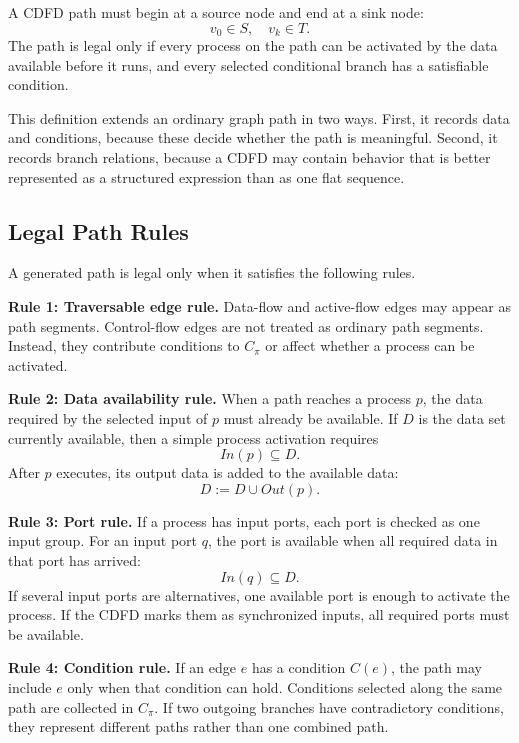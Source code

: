 \documentclass[conference]{template/IEEEtran}
\begin{document}
A CDFD path must begin at a source node and end at a sink node:
\begin{equation}
v_0\in S,\quad v_k\in T .
\end{equation}
The path is legal only if every process on the path can be activated by the data available before it runs, and every selected conditional branch has a satisfiable condition.

This definition extends an ordinary graph path in two ways. First, it records data and conditions, because these decide whether the path is meaningful. Second, it records branch relations, because a CDFD may contain behavior that is better represented as a structured expression than as one flat sequence.

\subsection{Legal Path Rules}

A generated path is legal only when it satisfies the following rules.

\textbf{Rule 1: Traversable edge rule.}
Data-flow and active-flow edges may appear as path segments. Control-flow edges are not treated as ordinary path segments. Instead, they contribute conditions to \(C_\pi\) or affect whether a process can be activated.

\textbf{Rule 2: Data availability rule.}
When a path reaches a process \(p\), the data required by the selected input of \(p\) must already be available. If \(D\) is the data set currently available, then a simple process activation requires
\begin{equation}
In(p)\subseteq D .
\end{equation}
After \(p\) executes, its output data is added to the available data:
\begin{equation}
D := D\cup Out(p).
\end{equation}

\textbf{Rule 3: Port rule.}
If a process has input ports, each port is checked as one input group. For an input port \(q\), the port is available when all required data in that port has arrived:
\begin{equation}
In(q)\subseteq D .
\end{equation}
If several input ports are alternatives, one available port is enough to activate the process. If the CDFD marks them as synchronized inputs, all required ports must be available.

\textbf{Rule 4: Condition rule.}
If an edge \(e\) has a condition \(C(e)\), the path may include \(e\) only when that condition can hold. Conditions selected along the same path are collected in \(C_\pi\). If two outgoing branches have contradictory conditions, they represent different paths rather than one combined path.
\end{document}
